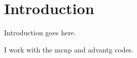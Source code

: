 \chapter{Introduction}
\label{chap:intro}

Introduction goes here.

I work with the \ac{mcnp} and \ac{advantg} codes.
